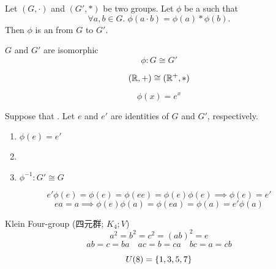 
\begin{frame}
  \begin{definition}[Isomorphism (同构)]
    Let $(G, \cdot)$ and $(G', \ast)$ be two groups.
    Let $\phi$ be a  such that
    \[
      \forall a, b \in G.\; \phi(a \cdot b) = \phi(a) \ast \phi(b).
    \]
    Then $\phi$ is an  from $G$ to $G'$.
  \end{definition}

  \pause
  \vspace{0.50cm}
  \begin{center}
    $G$ and $G'$ are isomorphic
    \[
      \phi: G \cong G'
    \]
  \end{center}
\end{frame}

\begin{frame}{}
  \begin{exampleblock}{}
    \[
      (\mathbb{R}, +) \cong (\mathbb{R}^{+}, \ast)
    \]
  \end{exampleblock}

  \pause
  \[
    \phi(x) = e^{x}
  \]
\end{frame}

\begin{frame}{}
  \begin{theorem}
    Suppose that .
    Let $e$ and $e'$ are identities of $G$ and $G'$, respectively.

    \begin{enumerate}[(1)]
      \setlength{\itemsep}{6pt}
      \item $\phi(e) = e'$
      \item {}
      \item $\phi^{-1}: G' \cong G$
    \end{enumerate}
  \end{theorem}

  \pause
  \[
    e' \phi(e) = \phi(e) = \phi(e e) = \phi(e) \phi(e) \implies \phi(e) = e'
  \]
  \[
    ea = a \implies \phi(e)\phi(a) = \phi(ea) = \phi(a) = e'\phi(a)
  \]
\end{frame}

\begin{frame}{}
  \begin{exampleblock}{Klein Four-group (四元群; $K_{4}; V$)}
    \[
      a^2 = b^2 = c^2 = (ab)^{2} = e
    \]
    \[
      ab = c = ba \quad ac = b = ca \quad bc = a = cb
    \]

    \pause
    \[
      U(8) = \{1, 3, 5, 7\}
    \]
  \end{exampleblock}
\end{frame}
